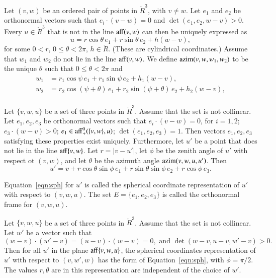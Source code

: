 \begin{definition} Let $(v,w)$ be an ordered pair of points in
$\ring{R}^3$, with $v\ne w$.  Let $e_1$ and $e_2$ be orthonormal
vectors
such that $e_i\cdot (v-w)=0$ and $\det(e_1,e_2,w-v)>0$.  Every
$u\in\ring{R}^3$ that is not in the line ${\operatorname{aff}}(v,w)$
can then be uniquely expressed as
   $$
   u = r\cos\theta\, e_1 + r\sin\theta\, e_2 + h (w-v),
   $$
for some $0< r$, $0\le \theta < 2\pi$, $h\in\ring{R}$.
(These are cylindrical coordinates.)  Assume that $w_1$ and $w_2$ do
not lie in the line ${\operatorname{aff}}(v,w)$.
We define ${\operatorname{azim}}(v,w,w_1,w_2)$ to be the unique $\theta$ such
that $0\le\theta < 2\pi$ and
  $$
  \begin{array}{lll}
    w_1 &= r_1\cos\psi\, e_1 + r_1\sin\psi\, e_2 + h_1(w-v),\\
    w_2 &=  r_2\cos(\psi+\theta)\, e_1 + r_2\sin(\psi+\theta)\, e_2 
     + h_2(w-v),\\
\end{array}
  $$
\end{definition}

\begin{lemma}\label{lemma:sph}
Let $\{v,w,u\}$ be a set of three points in $\ring{R}^3$.
Assume that the set is not collinear.  
Let $e_1,e_2,e_3$ be orthonormal vectors such that $e_i \cdot (v-w)=0$, for $i=1,2$;
$e_3\cdot (w-v)>0$; $e_1\in{\operatorname{aff}}_+^0(\{v,w\},u)$; $\det(e_1,e_2,e_3)=1$.
Then vectors $e_1,e_2,e_3$ satisfying these properties exist uniquely.
Furthermore, let $u'$ be a point that does not
lie in the line ${\operatorname{aff}}\{v,w\}$.
Let $r = |v - u'|$, let
$\phi$ be the zenith angle of $u'$ with respect ot $(v,w)$, and let
$\theta$ be the azimuth angle ${\operatorname{azim}}(v,w,u,u')$.  Then
   \begin{equation}
   u' = v + r \cos\theta \sin\phi\, e_1 + r \sin\theta\sin\phi\, e_2 +
   r\cos\phi\,e_3.
   \label{eqn:sph}
   \end{equation}
\end{lemma}

\begin{definition}\label{def:sph}
Equation~\ref{eqn:sph} for
$u'$ is called the spherical coordinate representation of
$u'$ with respect to $(v,w,u)$.  The set $E=\{e_1,e_2,e_3\}$ is called
the orthonormal frame for $(v,w,u)$.  
\end{definition}

\begin{lemma}\label{lemma:polar-gen}
Let $\{v,w,u\}$ be a set of three points in $\ring{R}^3$.
Assume that the set is not collinear.
Let $w'$ be a vector such that 
  $$(w-v)\cdot (w'-v) = (u-v)\cdot (w-v) = 0,\text{ and }
     \det(w-v,u-v,w'-v)>0.$$
Then for all $u'$ in the plane ${\operatorname{aff}}\{v,w,u\}$, the spherical coordinates
representation of $u'$ with respect to $(v,w',w)$ 
has the form of Equation~\ref{eqn:sph}, with $\phi=\pi/2$.
The values $r,\theta$ are in this representation are independent of the choice of $w'$. 
\end{lemma}

